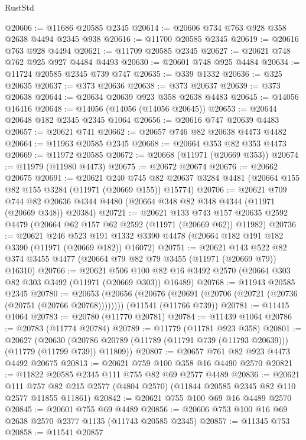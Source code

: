 \begin{lexlean}{RustStd}
\begin{coremodule}
@20606 := @11686 @20585 @2345
@20614 := @20606 @734 @763 @928 @358 @2638 @4494 @2345 @938
@20616 := @11700 @20585 @2345
@20619 := @20616 @763 @928 @4494
@20621 := @11709 @20585 @2345
@20627 := @20621 @748 @762 @925 @927 @4484 @4493
@20630 := @20601 @748 @925 @4484
@20634 := @11724 @20585 @2345 @739 @747
@20635 := @339 @1332
@20636 := @325 @20635
@20637 := @373 @20636
@20638 := @373 @20637
@20639 := @373 @20638
@20644 := @20634 @20639 @923 @358 @2638 @4483
@20645 := @14056 @16416
@20648 := @14056 (@14056 (@14056 @20645))
@20653 := @20644 @20648 @182 @2345 @2345 @1064
@20656 := @20616 @747 @20639 @4483
@20657 := @20621 @741
@20662 := @20657 @746 @82 @20638 @4473 @4482
@20664 := @11963 @20585 @2345
@20668 := @20664 @353 @82 @353 @4473
@20669 := @11972 @20585
@20672 := @20668 (@11971 (@20669 @353))
@20674 := @11979 (@11980 @4473)
@20675 := @20672 @20674
@20676 := @20662 @20675
@20691 := @20621
    @240
    @745
    @82
    @20637
    @3284
    @4481
    (@20664 @155 @82 @155 @3284 (@11971 (@20669 @155)) @15774)
@20706 := @20621
    @709
    @744
    @82
    @20636
    @4344
    @4480
    (@20664 @348 @82 @348 @4344 (@11971 (@20669 @348)) @20384)
@20721 := @20621
    @133
    @743
    @157
    @20635
    @2592
    @4479
    (@20664 @62 @157 @62 @2592 (@11971 (@20669 @62)) @11982)
@20736 := @20621
    @246
    @523
    @191
    @1332
    @3390
    @4478
    (@20664 @182 @191 @182 @3390 (@11971 (@20669 @182)) @16072)
@20751 := @20621
    @143
    @522
    @82
    @374
    @3455
    @4477
    (@20664 @79 @82 @79 @3455 (@11971 (@20669 @79)) @16310)
@20766 := @20621
    @506
    @100
    @82
    @16
    @3492
    @2570
    (@20664 @303 @82 @303 @3492 (@11971 (@20669 @303)) @16489)
@20768 := @11943 @20585 @2345
@20780 := @20653
    (@20656 (@20676 (@20691 (@20706 (@20721 (@20736 (@20751 (@20766 @20768))))))))
    (@11541 (@11766 @739))
@20781 := @11415 @1064
@20783 := @20780 (@11770 @20781)
@20784 := @11439 @1064
@20786 := @20783 (@11774 @20784)
@20789 := @11779 (@11781 @923 @358)
@20801 := @20627
    (@20630 (@20786 @20789 (@11789 (@11791 @739 (@11793 @20639))) (@11779 (@11799 @739)) @11809))
@20807 := @20657 @761 @82 @923 @4473 @4492 @20675
@20813 := @20621 @759 @100 @358 @16 @4490 @2570
@20821 := @11822 @20585 @2345 @111 @755 @82 @69 @2577 @4489
@20836 := @20621
    @111
    @757
    @82
    @215
    @2577
    (@4804 @2570)
    (@11844 @20585 @2345 @82 @110 @2577 @11855 @11861)
@20842 := @20621 @755 @100 @69 @16 @4489 @2570
@20845 := @20601 @755 @69 @4489
@20856 := @20606 @753 @100 @16 @69 @2638 @2570 @2377 @1135 (@11743 @20585 @2345)
@20857 := @11345 @753
@20858 := @11541 @20857

\end{coremodule}
\end{lexlean}
